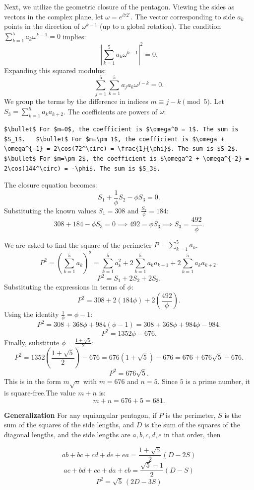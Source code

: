 \begin{enumerate}
 Next, we utilize the geometric closure of the pentagon. Viewing the sides as vectors in the complex plane, let $\omega = e^{i 72^\circ}$. The vector corresponding to side $a_k$ points in the direction of $\omega^{k-1}$ (up to a global rotation). The condition $\sum_{k=1}^5 a_k \omega^{k-1} = 0$ implies:
 \[\left| \sum_{k=1}^5 a_k \omega^{k-1} \right|^2 = 0.\]Expanding this squared modulus:
 \[\sum_{j=1}^5 \sum_{k=1}^5 a_j a_k \omega^{j-k} = 0.\]We group the terms by the difference in indices $m \equiv j-k \pmod 5$. Let $S_3 = \sum_{k=1}^5 a_k a_{k+2}$. The coefficients are powers of $\omega$:

 \begin{verbatim}
$\bullet$ For $m=0$, the coefficient is $\omega^0 = 1$. The sum is $S_1$.   $\bullet$ For $m=\pm 1$, the coefficient is $\omega + \omega^{-1} = 2\cos(72^\circ) = \frac{1}{\phi}$. The sum is $S_2$.   $\bullet$ For $m=\pm 2$, the coefficient is $\omega^2 + \omega^{-2} = 2\cos(144^\circ) = -\phi$. The sum is $S_3$.
\end{verbatim}

The closure equation becomes:
 \[S_1 + \frac{1}{\phi}S_2 - \phi S_3 = 0.\]Substituting the known values $S_1 = 308$ and $\frac{S_2}{\phi} = 184$:
 \[308 + 184 - \phi S_3 = 0 \implies 492 = \phi S_3 \implies S_3 = \frac{492}{\phi}.\]

 We are asked to find the square of the perimeter $P = \sum_{k=1}^5 a_k$.
 \[P^2 = \left( \sum_{k=1}^5 a_k \right)^2 = \sum_{k=1}^5 a_k^2 + 2 \sum_{k=1}^5 a_k a_{k+1} + 2 \sum_{k=1}^5 a_k a_{k+2}.\]
 \[P^2 = S_1 + 2 S_2 + 2 S_3.\]Substituting the expressions in terms of $\phi$:
 \[P^2 = 308 + 2(184\phi) + 2\left(\frac{492}{\phi}\right).\]Using the identity $\frac{1}{\phi} = \phi - 1$:
 \[P^2 = 308 + 368\phi + 984(\phi - 1) = 308 + 368\phi + 984\phi - 984.\]
 \[P^2 = 1352\phi - 676.\]Finally, substitute $\phi = \frac{1+\sqrt{5}}{2}$:
 \[P^2 = 1352\left(\frac{1+\sqrt{5}}{2}\right) - 676 = 676(1+\sqrt{5}) - 676 = 676 + 676\sqrt{5} - 676.\]
 \[P^2 = 676\sqrt{5}.\]This is in the form $m\sqrt{n}$ with $m = 676$ and $n = 5$. Since $5$ is a prime number, it is square-free.The value $m+n$ is:
 \[m+n = 676 + 5 = 681.\]

 \textbf{Generalization} For any equiangular pentagon, if $P$ is the perimeter, $S$ is the sum of the squares of the side lengths, and $D$ is the sum of the squares of the diagonal lengths, and the side lengths are $a, b, c, d, e$ in that order, then

 
 \[ab + bc + cd + de + ea = \frac{1 + \sqrt{5}}{2} (D - 2S)\]
 \[ac + bd + ce + da + eb = \frac{\sqrt{5} - 1}{2} (D - S)\]
 \[P^2 = \sqrt{5} \, (2D - 3S)\]




\end{enumerate}
